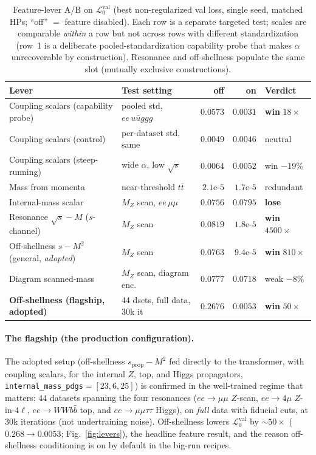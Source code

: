 \documentclass[11pt]{article}
\newcommand{\vlnr}{\mathcal{L}^{\mathrm{val}}_{0}}   %
\newcommand{\code}[1]{\texttt{#1}}
\begin{document}
\begin{table}[H]
\centering
\caption{Feature-lever A/B on $\vlnr$ (best non-regularized val loss, single seed, matched HPs;
``off'' $=$ feature disabled). Each row is a separate targeted test; scales are comparable
\emph{within} a row but not across rows with different standardization (row~1 is a deliberate
pooled-standardization capability probe that makes $\alpha$ unrecoverable by construction).
Resonance and off-shellness populate the same slot (mutually exclusive constructions).}
\label{tab:levers}
\begin{tabular}{@{}llrrl@{}}
\toprule
Lever & Test setting & off & on & Verdict \\
\midrule
Coupling scalars (capability probe) & pooled std, $ee\,u\bar ug\!g\!g$ & $0.0573$ & $0.0031$ & \textbf{win} $18\times$ \\
Coupling scalars (control) & per-dataset std, same & $0.0049$ & $0.0046$ & neutral \\
Coupling scalars (steep-running) & wide $\alpha$, low $\sqrt s$ & $0.0064$ & $0.0052$ & win $-19\%$ \\
Mass from momenta & near-threshold $t\bar t$ & $2.1\text{e-}5$ & $1.7\text{e-}5$ & redundant \\
Internal-mass scalar & $M_Z$ scan, $ee\,\mu\mu$ & $0.0756$ & $0.0795$ & \textbf{lose} \\
Resonance $\sqrt s-M$ ($s$-channel) & $M_Z$ scan & $0.0819$ & $1.8\text{e-}5$ & \textbf{win} $4500\times$ \\
Off-shellness $s-M^2$ (general, \emph{adopted}) & $M_Z$ scan & $0.0763$ & $9.4\text{e-}5$ & \textbf{win} $810\times$ \\
Diagram scanned-mass & $M_Z$ scan, diagram enc. & $0.0777$ & $0.0718$ & weak $-8\%$ \\
\textbf{Off-shellness (flagship, adopted)} & 44 dsets, full data, 30k it & $0.2676$ & $0.0053$ & \textbf{win} $50\times$ \\
\bottomrule
\end{tabular}
\end{table}

\paragraph{The flagship (the production configuration).} The adopted setup (off-shellness
$s_{\mathrm{prop}}-M^2$ fed directly to the transformer, with coupling scalars, for the internal
$Z$, top, and Higgs propagators, \code{internal\_mass\_pdgs}$=[23,6,25]$) is confirmed in the
well-trained regime that matters: $44$ datasets spanning the four resonances
($ee\!\to\!\mu\mu$ $Z$-scan, $ee\!\to\!4\mu$ $Z$-in-$4\ell$, $ee\!\to\!WWb\bar b$ top, and
$ee\!\to\!\mu\mu\tau\tau$ Higgs), on \emph{full} data with fiducial cuts, at $30$k iterations (not
undertraining noise). Off-shellness lowers $\vlnr$ by $\sim\!50\times$
($0.268\!\to\!0.0053$; Fig.~\ref{fig:levers}), the headline feature result, and the reason
off-shellness conditioning is on by default in the big-run recipes.
\end{document}
